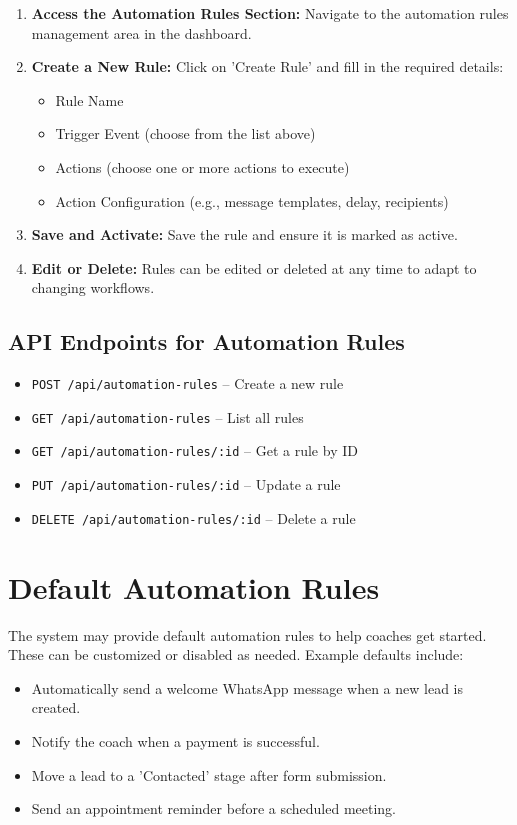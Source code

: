 \documentclass[12pt,a4paper]{article}
\begin{document}
\begin{enumerate}[leftmargin=2em]
    \item \textbf{Access the Automation Rules Section:} Navigate to the automation rules management area in the dashboard.
    \item \textbf{Create a New Rule:} Click on 'Create Rule' and fill in the required details:
    \begin{itemize}
        \item Rule Name
        \item Trigger Event (choose from the list above)
        \item Actions (choose one or more actions to execute)
        \item Action Configuration (e.g., message templates, delay, recipients)
    \end{itemize}
    \item \textbf{Save and Activate:} Save the rule and ensure it is marked as active.
    \item \textbf{Edit or Delete:} Rules can be edited or deleted at any time to adapt to changing workflows.
\end{enumerate}

\subsection*{API Endpoints for Automation Rules}
\begin{itemize}[leftmargin=2em]
    \item \texttt{POST /api/automation-rules} -- Create a new rule
    \item \texttt{GET /api/automation-rules} -- List all rules
    \item \texttt{GET /api/automation-rules/:id} -- Get a rule by ID
    \item \texttt{PUT /api/automation-rules/:id} -- Update a rule
    \item \texttt{DELETE /api/automation-rules/:id} -- Delete a rule
\end{itemize}

\section{Default Automation Rules}
The system may provide default automation rules to help coaches get started. These can be customized or disabled as needed. Example defaults include:

\begin{itemize}[leftmargin=2em]
    \item Automatically send a welcome WhatsApp message when a new lead is created.
    \item Notify the coach when a payment is successful.
    \item Move a lead to a 'Contacted' stage after form submission.
    \item Send an appointment reminder before a scheduled meeting.
\end{itemize}
\end{document}
